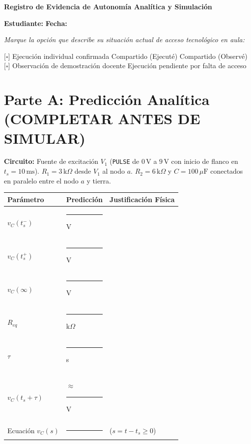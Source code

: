 \documentclass[11pt, a4paper]{article}
\begin{document}
\begin{tcolorbox}[colback=ucbblue!5!white, colframe=ucbblue, title=\textbf{Ficha Individual de Predicción y Contraste (Transitorios RC)}]
    \centering \textbf{Registro de Evidencia de Autonomía Analítica y Simulación}
\end{tcolorbox}

\textbf{Estudiante:} \hrulefill \quad \textbf{Fecha:} \hrulefill

\vspace{0.4cm}
\begin{tcolorbox}[colback=gray!5, colframe=gray!50, title=\textbf{Modalidad de Acceso al Simulador (LTspice)}]
\textit{Marque la opción que describe su situación actual de acceso tecnológico en aula:} 

\vspace{0.2cm}
{[$\square$]} Ejecución individual confirmada \quad {[$\square$]} Compartido (Ejecuté) \quad {[$\square$]} Compartido (Observé) \\[0.2cm]
{[$\square$]} Observación de demostración docente \quad {[$\square$]} Ejecución pendiente por falta de acceso
\end{tcolorbox}

\section*{Parte A: Predicción Analítica (COMPLETAR ANTES DE SIMULAR)}
\noindent\textbf{Circuito:} Fuente de excitación $V_1$ (\texttt{PULSE} de $0\,\text{V}$ a $9\,\text{V}$ con inicio de flanco en $t_s = 10\,\text{ms}$). $R_1=3\,\text{k}\Omega$ desde $V_1$ al nodo $a$. $R_2=6\,\text{k}\Omega$ y $C=100\,\mu\text{F}$ conectados en paralelo entre el nodo $a$ y tierra.

\vspace{0.3cm}
\renewcommand{\arraystretch}{1.5}
\noindent
\begin{tabularx}{\textwidth}{p{3cm} >{\centering\arraybackslash}p{3.5cm} >{\RaggedRight\arraybackslash}X}
\toprule
\textbf{Parámetro} & \textbf{Predicción} & \textbf{Justificación Física} \\ 
\midrule
$v_C(t_s^-)$ & \rule{2.5cm}{0.4pt} V & \\[0.5cm] 
$v_C(t_s^+)$ & \rule{2.5cm}{0.4pt} V & \\[0.5cm] 
$v_C(\infty)$ & \rule{2.5cm}{0.4pt} V & \\[0.5cm] 
$R_{eq}$ & \rule{2.5cm}{0.4pt} k$\Omega$ & \\[0.5cm] 
$\tau$ & \rule{2.5cm}{0.4pt} s & \\[0.5cm] 
$v_C(t_s + \tau)$ & $\approx$ \rule{2cm}{0.4pt} V & \\[0.5cm] 
Ecuación $v_C(s)$ & \rule{3cm}{0.4pt} & ($s = t - t_s \ge 0$) \\[0.2cm] 
\bottomrule
\end{tabularx}
\end{document}
